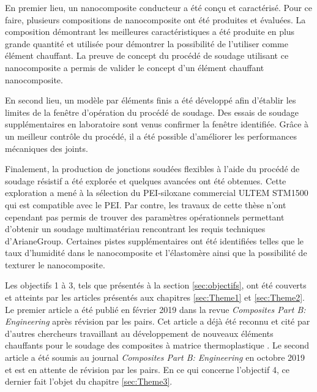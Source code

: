 En premier lieu, un nanocomposite conducteur a été conçu et caractérisé. 
Pour ce faire, plusieurs compositions de nanocomposite ont été produites et évaluées. 
La composition démontrant les meilleures caractéristiques a été produite en plus grande quantité et utilisée pour démontrer la possibilité de l'utiliser comme élément chauffant. 
La preuve de concept du procédé de soudage utilisant ce nanocomposite a permis de valider le concept d'un élément chauffant nanocomposite. 

En second lieu, un modèle par éléments finis a été développé afin d'établir les limites de la fenêtre d'opération du procédé de soudage. 
Des essais de soudage supplémentaires en laboratoire sont venus confirmer la fenêtre identifiée. 
Grâce à un meilleur contrôle du procédé, il a été possible d'améliorer les performances mécaniques des joints. 

Finalement, la production de jonctions soudées flexibles à l'aide du procédé de soudage résistif a été explorée et quelques avancées ont été obtenues. 
Cette exploration a mené à la sélection du PEI-siloxane commercial ULTEM STM1500 qui est compatible avec le PEI. 
Par contre, les travaux de cette thèse n'ont cependant pas permis de trouver des paramètres opérationnels permettant d'obtenir un soudage multimatériau rencontrant les requis techniques d'ArianeGroup. 
Certaines pistes supplémentaires ont été identifiées telles que le taux d'humidité dans le nanocomposite et l'élastomère ainsi que la possibilité de texturer le nanocomposite. 

Les objectifs 1 à 3, tels que présentés à la section \ref{sec:objectifs}, ont été couverts et atteints par les articles présentés aux chapitres \ref{sec:Theme1} et \ref{sec:Theme2}. 
Le premier article \cite{Brassard2019a} a été publié en février 2019 dans la revue \textit{Composites Part B: Engineering} après révision par les pairs. 
Cet article a déjà été reconnu et cité par d'autres chercheurs travaillant au développement de nouveaux éléments chauffants pour le soudage des composites à matrice thermoplastique \cite{Russello2019}. 
Le second article a été soumis au journal \textit{Composites Part B: Engineering} en octobre 2019 et est en attente de révision par les pairs. 
En ce qui concerne l'objectif 4, ce dernier fait l'objet du chapitre \ref{sec:Theme3}. 